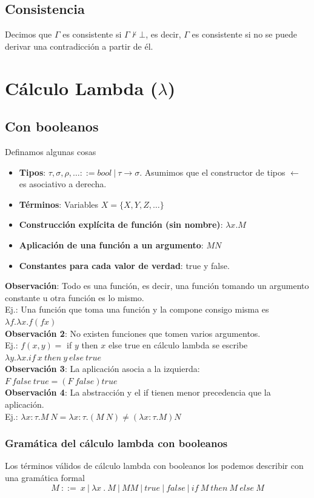 \documentclass[10pt,a4paper]{article}
\begin{document}
\subsection*{Consistencia}
Decimos que $\Gamma$ es consistente si $\Gamma \nvdash \bot$, es decir, $\Gamma$ es consistente si no se puede derivar una contradicción a partir de él.
\section*{Cálculo Lambda ($\lambda$)}
\subsection*{Con booleanos}
Definamos algunas cosas 
\begin{itemize}
    \item \textbf{Tipos}: $\tau, \sigma, \rho, \dots ::= bool \ | \ \tau \rightarrow \sigma$. 
    Asumimos que el constructor de tipos $\leftarrow$ es asociativo a derecha.
    \item \textbf{Términos}: Variables $X = \{X, Y, Z, \dots\}$
    \item \textbf{Construcción explícita de función (sin nombre)}: $\lambda x . M$ 
    \item \textbf{Aplicación de una función a un argumento}: $MN$ 
    \item \textbf{Constantes para cada valor de verdad}: true y false.
\end{itemize}
\textbf{Observación}: Todo es una función, es decir, una función tomando un argumento constante u otra función es lo mismo. \\
Ej.: Una función que toma una función y la compone consigo misma es $\lambda f . \lambda x . f(fx)$ \\
\textbf{Observación 2}: No existen funciones que tomen varios argumentos. \\ 
Ej.: $f(x,y) = $ if $y$ then $x$ else true en cálculo lambda se escribe $\lambda y . \lambda x . if \ x \ then \ y \ else \ true$ \\
\textbf{Observación 3}: La aplicación asocia a la izquierda: $F \ false \ true = (F \ false) true$ \\
\textbf{Observación 4}: La abstracción y el if tienen menor precedencia que la aplicación. \\
Ej.: $\lambda x:\tau . M \ N = \lambda x : \tau . (M \ N) \neq (\lambda x : \tau . M) N$ 
\subsubsection*{Gramática del cálculo lambda con booleanos}
Los términos válidos de cálculo lambda con booleanos los podemos describir con una gramática formal 
\[M \ ::= \ x \ |\  \lambda x \ . \ M \ | \ MM \ | \ true \ | \ false \ | \ if \ M \ then \ M \ else \ M\] 
\end{document}
